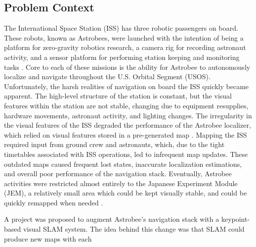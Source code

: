 \subsection{Problem Context}


The International Space Station (ISS) has three robotic passengers on board. These robots, known as Astrobees, were launched with the intention of being a platform for zero-gravity robotics research, a camera rig for recording astronaut activity, and a sensor platform for performing station keeping and monitoring tasks \cite{smithASTROBEENEWPLATFORM}. Core to each of these missions is the ability for Astrobee to autonomously localize and navigate throughout the U.S. Orbital Segment (USOS). Unfortunately, the harsh realities of navigation on board the ISS quickly became apparent. The high-level structure of the station is constant, but the visual features within the station are not stable, changing due to equipment resupplies, hardware movements, astronaut activity, and lighting changes. The irregularity in the visual features of the ISS degraded the performance of the Astrobee localizer, which relied on visual features stored in a pre-generated map \cite{soussanAstroLocEfficientRobust2022}. Mapping the ISS required input from ground crew and astronauts, which, due to the tight timetables associated with ISS operations, led to infrequent map updates. These outdated maps caused frequent lost states, inaccurate localization estimations, and overall poor performance of the navigation stack. Eventually, Astrobee activities were restricted almost entirely to the Japanese Experiment Module (JEM), a relatively small area which could be kept visually stable, and could be quickly remapped when needed \cite{carlinoLessonsLearnedAstrobee}.

A project was proposed to augment Astrobee's navigation stack with a keypoint-based visual SLAM system. The idea behind this change was that SLAM could produce new maps with each 

